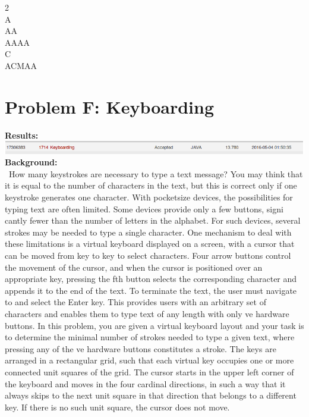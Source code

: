 \documentclass[12pt]{article}
\begin{document}
 2 \\
A       \\
AA      \\
AAAA    \\
C       \\
ACMAA
\newpage








\section{Problem F: Keyboarding}
\noindent \textbf{Results:} \\

\includegraphics[width=\textwidth]{ProblemF} \\

\noindent \textbf{Background:} \\
~\indent How many keystrokes are necessary to type a text message? You may think that it is equal to the
number of characters in the text, but this is correct only if one keystroke generates one character.
With pocketsize devices, the possibilities for typing text are often limited. Some devices provide only
a few buttons, signi cantly fewer than the number of letters in the alphabet. For such devices, several
strokes may be needed to type a single character. One mechanism to deal with these limitations is
a virtual keyboard displayed on a screen, with a cursor that can be moved from key to key to select
characters. Four arrow buttons control the movement of the cursor, and when the cursor is positioned
over an appropriate key, pressing the  fth button selects the corresponding character and appends it
to the end of the text. To terminate the text, the user must navigate to and select the Enter key. This
provides users with an arbitrary set of characters and enables them to type text of any length with
only  ve hardware buttons. In this problem, you are given a virtual keyboard layout and your task
is to determine the minimal number of strokes needed to type a given text, where pressing any of the
ve hardware buttons constitutes a stroke. The keys are arranged in a rectangular grid, such that each
virtual key occupies one or more connected unit squares of the grid. The cursor starts in the upper left
corner of the keyboard and moves in the four cardinal directions, in such a way that it always skips to
the next unit square in that direction that belongs to a different key. If there is no such unit square,
the cursor does not move. \\
\end{document}
